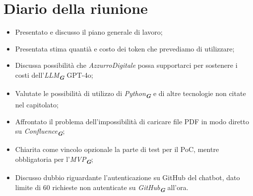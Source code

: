 

\section{Diario della riunione}

\begin{itemize}
    \item Presentato e discusso il piano generale di lavoro;
    \item Presentata stima quantià e costo dei token che prevediamo di utilizzare;
    \item Discussa possibilità che \emph{AzzurroDigitale} possa supportarci per sostenere i costi dell'\emph{LLM}\textsubscript{\textit{\textbf{G}}} GPT-4o;
    \item Valutate le possibilità di utilizzo di \emph{Python}\textsubscript{\textit{\textbf{G}}} e di altre tecnologie non citate nel capitolato;
    \item Affrontato il problema dell'impossibilità di caricare file PDF in modo diretto su \emph{Confluence}\textsubscript{\textit{\textbf{G}}};
    \item Chiarita come vincolo opzionale la parte di test per il PoC, mentre obbligatoria per l'\emph{MVP}\textsubscript{\textit{\textbf{G}}};
    \item Discusso dubbio riguardante l'autenticazione su GitHub del chatbot, dato limite di 60 richieste non autenticate su \emph{GitHub}\textsubscript{\textit{\textbf{G}}} all'ora.
\end{itemize}